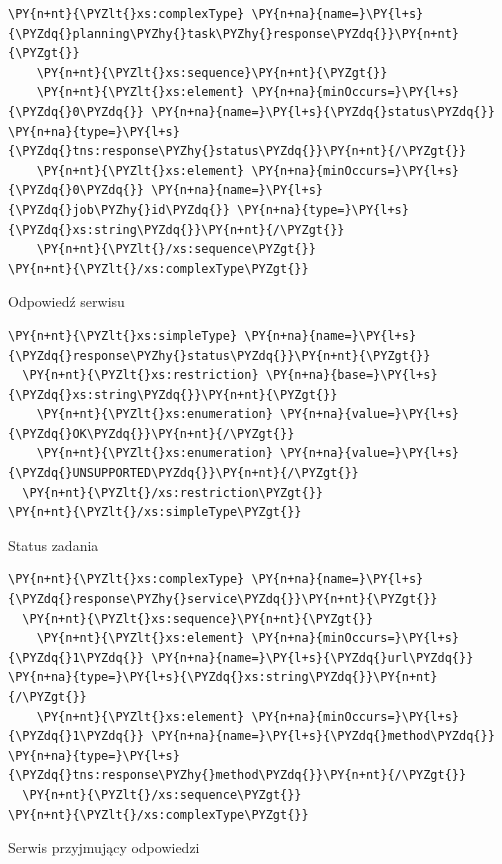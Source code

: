 \begin{program}
\begin{code}
\begin{Verbatim}[commandchars=\\\{\}]
\PY{n+nt}{\PYZlt{}xs:complexType} \PY{n+na}{name=}\PY{l+s}{\PYZdq{}planning\PYZhy{}task\PYZhy{}response\PYZdq{}}\PY{n+nt}{\PYZgt{}}
    \PY{n+nt}{\PYZlt{}xs:sequence}\PY{n+nt}{\PYZgt{}}
	\PY{n+nt}{\PYZlt{}xs:element} \PY{n+na}{minOccurs=}\PY{l+s}{\PYZdq{}0\PYZdq{}} \PY{n+na}{name=}\PY{l+s}{\PYZdq{}status\PYZdq{}} \PY{n+na}{type=}\PY{l+s}{\PYZdq{}tns:response\PYZhy{}status\PYZdq{}}\PY{n+nt}{/\PYZgt{}}
	\PY{n+nt}{\PYZlt{}xs:element} \PY{n+na}{minOccurs=}\PY{l+s}{\PYZdq{}0\PYZdq{}} \PY{n+na}{name=}\PY{l+s}{\PYZdq{}job\PYZhy{}id\PYZdq{}} \PY{n+na}{type=}\PY{l+s}{\PYZdq{}xs:string\PYZdq{}}\PY{n+nt}{/\PYZgt{}}
    \PY{n+nt}{\PYZlt{}/xs:sequence\PYZgt{}}
\PY{n+nt}{\PYZlt{}/xs:complexType\PYZgt{}}
\end{Verbatim}
\end{code}
\caption{Odpowiedź serwisu}
\end{program}

\begin{program}
\begin{code}
\begin{Verbatim}[commandchars=\\\{\}]
\PY{n+nt}{\PYZlt{}xs:simpleType} \PY{n+na}{name=}\PY{l+s}{\PYZdq{}response\PYZhy{}status\PYZdq{}}\PY{n+nt}{\PYZgt{}}
  \PY{n+nt}{\PYZlt{}xs:restriction} \PY{n+na}{base=}\PY{l+s}{\PYZdq{}xs:string\PYZdq{}}\PY{n+nt}{\PYZgt{}}
    \PY{n+nt}{\PYZlt{}xs:enumeration} \PY{n+na}{value=}\PY{l+s}{\PYZdq{}OK\PYZdq{}}\PY{n+nt}{/\PYZgt{}}
    \PY{n+nt}{\PYZlt{}xs:enumeration} \PY{n+na}{value=}\PY{l+s}{\PYZdq{}UNSUPPORTED\PYZdq{}}\PY{n+nt}{/\PYZgt{}}
  \PY{n+nt}{\PYZlt{}/xs:restriction\PYZgt{}}
\PY{n+nt}{\PYZlt{}/xs:simpleType\PYZgt{}}
\end{Verbatim}
\end{code}
\caption{Status zadania}
\end{program}

\begin{program}
\begin{code}
\begin{Verbatim}[commandchars=\\\{\}]
\PY{n+nt}{\PYZlt{}xs:complexType} \PY{n+na}{name=}\PY{l+s}{\PYZdq{}response\PYZhy{}service\PYZdq{}}\PY{n+nt}{\PYZgt{}}
  \PY{n+nt}{\PYZlt{}xs:sequence}\PY{n+nt}{\PYZgt{}}
    \PY{n+nt}{\PYZlt{}xs:element} \PY{n+na}{minOccurs=}\PY{l+s}{\PYZdq{}1\PYZdq{}} \PY{n+na}{name=}\PY{l+s}{\PYZdq{}url\PYZdq{}} \PY{n+na}{type=}\PY{l+s}{\PYZdq{}xs:string\PYZdq{}}\PY{n+nt}{/\PYZgt{}}
    \PY{n+nt}{\PYZlt{}xs:element} \PY{n+na}{minOccurs=}\PY{l+s}{\PYZdq{}1\PYZdq{}} \PY{n+na}{name=}\PY{l+s}{\PYZdq{}method\PYZdq{}} \PY{n+na}{type=}\PY{l+s}{\PYZdq{}tns:response\PYZhy{}method\PYZdq{}}\PY{n+nt}{/\PYZgt{}}
  \PY{n+nt}{\PYZlt{}/xs:sequence\PYZgt{}}
\PY{n+nt}{\PYZlt{}/xs:complexType\PYZgt{}}
\end{Verbatim}
\end{code}
\caption{Serwis przyjmujący odpowiedzi}
\end{program}

